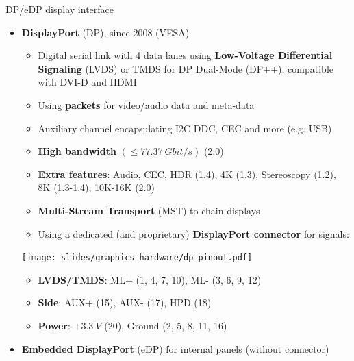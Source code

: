 \begin{frame}{DP/eDP display interface}
  \begin{itemize}
  \item \textbf{DisplayPort} (DP), since 2008 (VESA)
    \begin{itemize}
    \item Digital serial link with 4 data lanes using \textbf{Low-Voltage Differential Signaling} (LVDS)
    or TMDS for DP Dual-Mode (DP++), compatible with DVI-D and HDMI
    \item Using \textbf{packets} for video/audio data and meta-data 
    \item Auxiliary channel encapsulating I2C DDC, CEC and more (e.g. USB)
    \item \textbf{High bandwidth} \((\leq 77.37~Gbit/s)\) (2.0)
    \item \textbf{Extra features}: Audio, CEC, HDR (1.4), 4K (1.3), Stereoscopy (1.2),\\8K (1.3-1.4),  10K-16K (2.0)
    \item \textbf{Multi-Stream Transport} (MST) to chain displays
    \item Using a dedicated (and proprietary) \textbf{DisplayPort connector} for signals:
    \end{itemize}
  \begin{center}
    \texttt{[image: slides/graphics-hardware/dp-pinout.pdf]}
  \end{center}
  \begin{itemize}
  \item \textbf{LVDS/TMDS}: ML+ {\footnotesize(1, 4, 7, 10)}, ML- {\footnotesize(3, 6, 9, 12)}
  \item \textbf{Side}: AUX+ (15), AUX- (17), HPD (18)
  \item \textbf{Power}: \(+3.3~V\) {\footnotesize(20)}, Ground {\footnotesize(2, 5, 8, 11, 16)}
  \end{itemize}
  \item \textbf{Embedded DisplayPort} (eDP) for internal panels (without connector)
  \end{itemize}
\end{frame}

